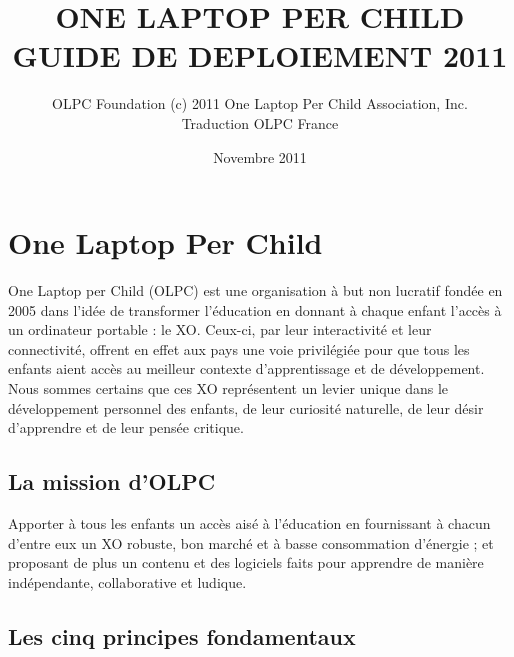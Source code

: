 \documentclass[12pt]{article}
\title{ONE LAPTOP PER CHILD\\GUIDE DE DEPLOIEMENT 2011}
\author{OLPC Foundation (c) 2011 One Laptop Per Child Association, Inc.\\Traduction OLPC France}
\date{Novembre 2011}
\begin{document}
\maketitle

\setcounter{tocdepth}{3}
\tableofcontents
\vspace*{1cm}

\listoffigures
\listoftables
\pagebreak

\section{One Laptop Per Child}
\label{sec-1}


One Laptop per Child (OLPC) est une organisation à but non lucratif fondée
en 2005 dans l'idée de transformer l'éducation en donnant à chaque enfant
l'accès à un ordinateur portable : le XO. Ceux-ci, par leur interactivité
et leur connectivité, offrent en effet aux pays une voie privilégiée pour
que tous les enfants aient accès au meilleur contexte d'apprentissage et de
développement. Nous sommes certains que ces XO représentent un levier
unique dans le développement personnel des enfants, de leur curiosité
naturelle, de leur désir d'apprendre et de leur pensée critique.
\subsection{La mission d'OLPC}
\label{sec-1-1}


Apporter à tous les enfants un accès aisé à l'éducation en fournissant à
chacun d'entre eux un XO robuste, bon marché et à basse consommation
d'énergie ; et proposant de plus un contenu et des logiciels faits pour
apprendre de manière indépendante, collaborative et ludique.
\subsection{Les cinq principes fondamentaux}
\label{sec-1-2}
\end{document}
